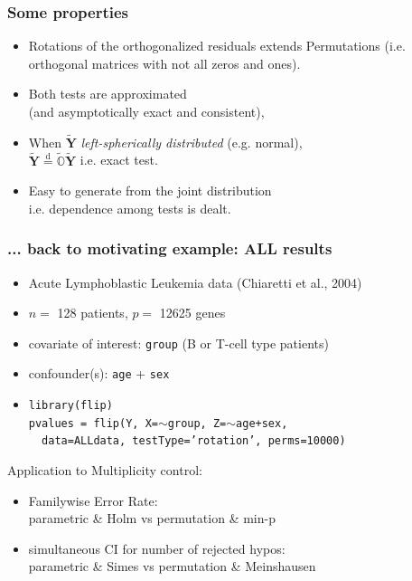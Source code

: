 \documentclass[xcolor={pdftex,dvipsnames,table}]{beamer}
\newcommand{\bb}[1]{\begin{block}{#1}}
\newcommand{\eb}{\end{block}}
\newcommand{\bi}{\begin {itemize}}
\newcommand{\ei}{\end{itemize}}
\begin{document}
\begin{frame}
\frametitle{Some properties}
\bi
\item Rotations of the orthogonalized residuals extends Permutations (i.e. orthogonal matrices with not all zeros and ones).
\item Both tests are approximated \\(and asymptotically exact and consistent),
\item When $\tilde{\mathbf{Y}}$ \emph{left-spherically distributed} (e.g. normal),  \\
$\tilde{\mathbf{Y}}  \stackrel{\mathrm{d}}{=} \tilde{\mathbb{O}}\tilde{\mathbf{Y}}$ i.e. exact test.
\medskip
\pause
\item Easy to generate from the joint distribution\\ i.e. dependence among tests is dealt.
\ei
\end{frame}
\begin{frame}
\frametitle{... back to motivating example: ALL results}
\bi
\item Acute Lymphoblastic Leukemia data (Chiaretti et al., 2004)
\item $n =$ 128 patients,  $p =$ \textcolor{redUnipd}{12625 genes}
\item covariate of interest: {\tt group} (B or T-cell type patients)
\item \textcolor{redUnipd} {confounder(s): {\tt age} + {\tt sex} }
\pause
\item \textcolor{myblue}{\tt library(flip) \\ pvalues = flip(Y, X=$\sim$group, Z=$\sim$age+sex, \\ \ \ data=ALLdata, testType='rotation', perms=10000)}
\ei
\pause
\bb{Application to Multiplicity control:}
\bi
\item Familywise Error Rate:\\ parametric \& Holm vs permutation \& min-p
\pause
\item simultaneous CI for number of rejected hypos:
\\ parametric \& Simes vs permutation \& Meinshausen
\ei
\eb

\end{frame}
\end{document}
